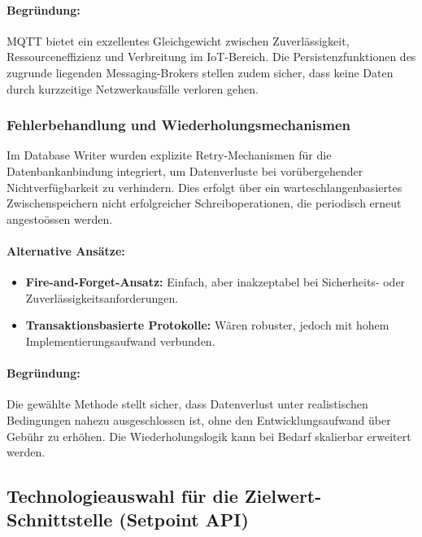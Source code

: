 \paragraph*{Begr\"undung:}

MQTT bietet ein exzellentes Gleichgewicht zwischen Zuverl\"assigkeit, Ressourceneffizienz und Verbreitung im IoT-Bereich. Die Persistenzfunktionen des zugrunde liegenden Messaging-Brokers stellen zudem sicher, dass keine Daten durch kurzzeitige Netzwerkausf\"alle verloren gehen.

\subsubsection*{Fehlerbehandlung und Wiederholungsmechanismen}

Im Database Writer wurden explizite Retry-Mechanismen f\"ur die Datenbankanbindung integriert, um Datenverluste bei vor\"ubergehender Nichtverf\"ugbarkeit zu verhindern. Dies erfolgt \"uber ein warteschlangenbasiertes Zwischenspeichern nicht erfolgreicher Schreiboperationen, die periodisch erneut angesto\"ossen werden.

\paragraph*{Alternative Ans\"atze:}

\begin{itemize}
  \item \textbf{Fire-and-Forget-Ansatz:} Einfach, aber inakzeptabel bei Sicherheits- oder Zuverl\"assigkeitsanforderungen.
  \item \textbf{Transaktionsbasierte Protokolle:} W\"aren robuster, jedoch mit hohem Implementierungsaufwand verbunden.
\end{itemize}

\paragraph*{Begr\"undung:}

Die gew\"ahlte Methode stellt sicher, dass Datenverlust unter realistischen Bedingungen nahezu ausgeschlossen ist, ohne den Entwicklungsaufwand \"uber Geb\"uhr zu erh\"ohen. Die Wiederholungslogik kann bei Bedarf skalierbar erweitert werden.

\subsection{Technologieauswahl f\"ur die Zielwert-Schnittstelle (Setpoint API)}

